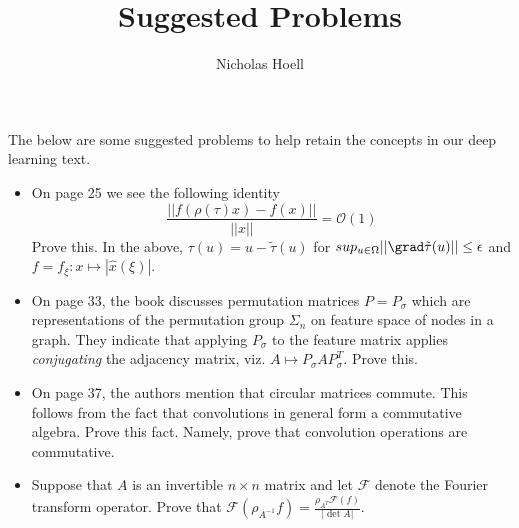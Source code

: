 \documentclass[12pt]{article}
\title{Suggested Problems}
\author{Nicholas Hoell}
\begin{document}
\maketitle
The below are some suggested problems to help retain the concepts in our deep learning text. 

\begin{itemize}
\item On page 25 we see the following identity
\[ \frac{|| f(\rho(\tau) x) -f(x)||  }{||x||} = \mathcal{O}(1)\]
Prove this.  In the above, $\tau(u) = u - \tilde{\tau}(u)$ for $sup_{u \in \Omega}||\grad \tilde{\tau} (u)|| \leq \epsilon$ and $f = f_\xi : x \mapsto |\hat{x}(\xi)|$. 
\item On page 33, the book discusses permutation matrices $P = P_\sigma$ which are representations of the permutation group $\Sigma_n$ on feature space of nodes in a graph.  They indicate that applying $P_\sigma$ to the feature matrix applies {\it conjugating} the adjacency matrix, viz. $A \mapsto P_\sigma AP_\sigma ^T$.  Prove this. 
\item On page 37, the authors mention that circular matrices commute.  This follows from the fact that convolutions in general form a commutative algebra.  Prove this fact.  Namely, prove that convolution operations are commutative. 

\item Suppose that $A$ is an invertible $n\times n$ matrix and let $\mathcal{F}$ denote the Fourier transform operator.  Prove that $\mathcal{F}(\rho_{A^{-1}} f) = \frac{\rho_{A^T}\mathcal{F}(f)}{|\det A|}$. 

\end{itemize}
\end{document}
